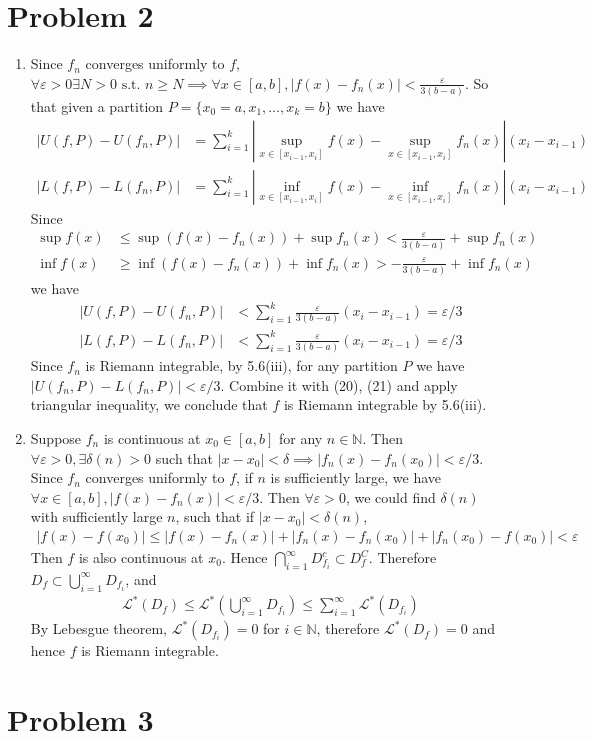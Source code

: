 \documentclass[a4paper]{report}
\def\ve{\varepsilon}
\newcommand{\mcal}[1]{\mathcal{#1}}
\begin{document}
\section*{Problem 2}

\begin{enumerate}[label=(\alph*)]

\item 
Since $f_n$ converges uniformly to $f$, $\forall \ve > 0 \exists N > 0 \text{ s.t. } n \ge
N \implies \forall x \in [a,b], |f(x) - f_n(x)| < \frac{\ve}{3(b-a)}$. So that given a 
partition $P = \{x_0=a, x_1, \ldots, x_k = b\}$ we have 
\begin{align}
    |U(f, P) - U(f_n, P)| &= \sum_{i=1}^k \left|\sup_{x\in [x_{i-1}, x_i]} f(x)-\sup_{x\in 
        [x_{i-1}, x_i]} f_n(x) \right| (x_i - x_{i-1}) \\
    |L(f, P) - L(f_n, P)| &= \sum_{i=1}^k \left|\inf_{x\in [x_{i-1}, x_i]} f(x)-\inf_{x\in 
        [x_{i-1}, x_i]} f_n(x) \right| (x_i - x_{i-1})
\end{align}
Since 
\begin{align}
    \sup f(x) &\le \sup (f(x) - f_n(x)) + \sup f_n(x) < \frac{\ve}{3(b-a)}+\sup f_n(x) \\
    \inf f(x) &\ge \inf (f(x) - f_n(x)) + \inf f_n(x) > -\frac{\ve}{3(b-a)}+\inf f_n(x)
\end{align}
we have 
\begin{align}
    |U(f, P) - U(f_n, P)| &< \sum_{i=1}^k \frac{\ve}{3(b-a)} (x_i - x_{i-1}) = \ve / 3 \\
    |L(f, P) - L(f_n, P)| &< \sum_{i=1}^k \frac{\ve}{3(b-a)} (x_i - x_{i-1}) = \ve / 3
\end{align}
Since $f_n$ is Riemann integrable, by 5.6(iii), for any partition $P$ we have 
$|U(f_n, P) - L(f_n, P)| < \ve / 3$. Combine it with (20), (21) and apply triangular 
inequality, we conclude that $f$ is Riemann integrable by 5.6(iii).

\item

Suppose $f_n$ is continuous at $x_0 \in [a, b]$ for any $n \in \mathbb{N}$. Then $\forall 
\ve > 0, \exists \delta(n) > 0$ such that $|x - x_0| < \delta \implies |f_n(x) - f_n(x_0)|
< \ve / 3$. Since $f_n$ converges uniformly to $f$, if $n$ is sufficiently large,
we have $\forall x \in [a,b], |f(x) - f_n(x)| < \ve / 3$. Then $\forall \ve > 0$, we could 
find $\delta(n)$ with sufficiently large $n$, such that if $|x - x_0| < \delta(n)$, 
\begin{align}
    |f(x)-f(x_0)| \le |f(x) - f_n(x)| + |f_n(x) - f_n(x_0)| + |f_n(x_0) - f(x_0)| < \ve
\end{align}
Then $f$ is also continuous at $x_0$. Hence $\bigcap_{i=1}^\infty D_{f_i}^c \subset D_f^C$.
Therefore $D_f \subset \bigcup_{i=1}^\infty D_{f_i}$, and 
\begin{align}
    \mcal{L}^*(D_f) \le \mcal{L}^*\left(\bigcup_{i=1}^\infty D_{f_i}\right) \le 
    \sum_{i=1}^\infty \mcal{L}^* ({D_{f_i}})
\end{align}
By Lebesgue theorem, $\mcal{L}^* ({D_{f_i}}) = 0$ for $i \in \mathbb{N}$, therefore 
$\mcal{L}^* (D_f) = 0$ and hence $f$ is Riemann integrable.

\end{enumerate}

\section*{Problem 3}
\end{document}
